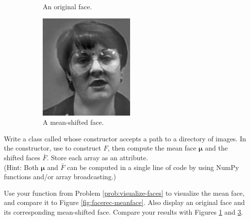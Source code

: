 \begin{figure}[H]
\begin{subfigure}{.32\textwidth}
    \caption{An original face.}
    \label{fig:facerec-original}
\end{subfigure}
%
\begin{subfigure}{.32\textwidth}
    \centering
    \includegraphics[width=\textwidth]{figures/differenceFace0.png}
    \caption{A mean-shifted face.}
    \label{fig:facerec-shifted}
\end{subfigure}
\caption{}
\end{figure}

\begin{problem} %
\label{prob:meanFace}
Write a class called  whose constructor accepts a path to a directory of images.
In the constructor, use  to construct $F$, then compute the mean face $\boldsymbol\mu$ and the shifted faces $\bar{F}$.
Store each array as an attribute.
\\(Hint: Both $\boldsymbol\mu$ and $\bar{F}$ can be computed in a single line of code by using NumPy functions and/or array broadcasting.)

Use your function from Problem \ref{prob:visualize-faces} to visualize the mean face, and compare it to Figure \ref{fig:facerec-meanface}.
Also display an original face and its corresponding mean-shifted face.
Compare your results with Figures \ref{fig:facerec-original} and \ref{fig:facerec-shifted}.
\end{problem}

